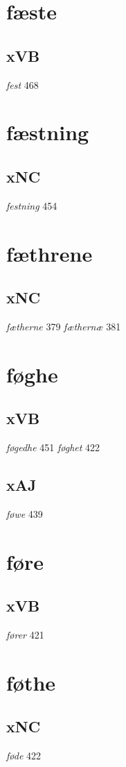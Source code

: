 \documentclass[a4paper,twocolumn]{article}
\begin{document}
\section{fæste}
\label{sec:orga9f8d7e}
\subsection{xVB}
\label{sec:org9a3fd14}
\emph{fest} 468 
\section{fæstning}
\label{sec:org68f4ada}
\subsection{xNC}
\label{sec:org86543b5}
\emph{festning} 454 
\section{fæthrene}
\label{sec:org20d2da7}
\subsection{xNC}
\label{sec:org1cbeb4a}
\emph{fætherne} 379 \emph{fæthernæ} 381 
\section{føghe}
\label{sec:org5b39498}
\subsection{xVB}
\label{sec:org576e68b}
\emph{føgedhe} 451 \emph{føghet} 422 
\subsection{xAJ}
\label{sec:org8942c6c}
\emph{føwe} 439 
\section{føre}
\label{sec:org280310e}
\subsection{xVB}
\label{sec:org8d2921e}
\emph{fører} 421 
\section{føthe}
\label{sec:org0e8b81c}
\subsection{xNC}
\label{sec:orga7711c8}
\emph{føde} 422 
\end{document}
